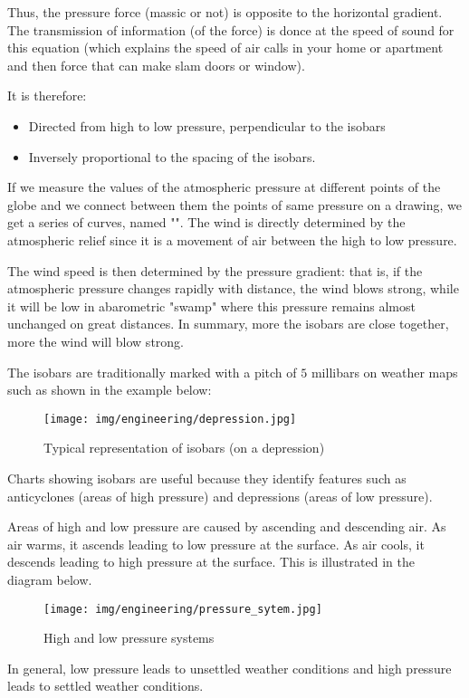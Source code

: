 	Thus, the pressure force (massic or not) is opposite to the horizontal gradient. The transmission of information (of the force) is donce at the speed of sound for this equation (which explains the speed of air calls in your home or apartment and then force that can make slam doors or window).

It is therefore:

	\begin{itemize}
		\item  Directed from high to low pressure, perpendicular to the isobars

		\item Inversely proportional to the spacing of the isobars.
	\end{itemize}
	If we measure the values of the atmospheric pressure at different points of the globe and we connect between them the points of same pressure on a drawing, we get a series of curves, named "". The wind is directly determined by the atmospheric relief since it is a movement of air between the high to low pressure.

	The wind speed is then determined by the pressure gradient: that is, if the atmospheric pressure changes rapidly with distance, the wind blows strong, while it will be low in abarometric  "swamp" where this pressure remains almost unchanged on great distances. In summary, more the isobars are close together, more the wind will blow strong.

	The isobars are traditionally marked with a pitch of $5$ millibars on weather maps such as shown in the example below:
	\begin{figure}[H]
		\begin{center}
			\texttt{[image: img/engineering/depression.jpg]}
		\end{center}	
		\caption{Typical representation of isobars (on a depression)}
	\end{figure}
	Charts showing isobars are useful because they identify features such as anticyclones (areas of high pressure) and depressions (areas of low pressure).

	Areas of high and low pressure are caused by ascending and descending air. As air warms, it ascends leading to low pressure at the surface. As air cools, it descends leading to high pressure at the surface. This is illustrated in the diagram below.
	\begin{figure}[H]
		\begin{center}
			\texttt{[image: img/engineering/pressure\_sytem.jpg]}
		\end{center}	
		\caption{High and low pressure systems}
	\end{figure}
	In general, low pressure leads to unsettled weather conditions and high pressure leads to settled weather conditions.

